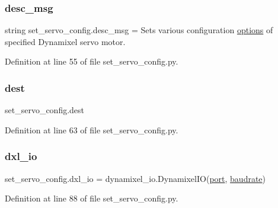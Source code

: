 \subsubsection{\texorpdfstring{desc\+\_\+msg}{desc\_msg}}
{\footnotesize\ttfamily string set\+\_\+servo\+\_\+config.\+desc\+\_\+msg = \textquotesingle{}Sets various configuration \hyperlink{namespaceset__servo__config_ac255726a992a254f0b0e6072b0f86233}{options} of specified Dynamixel servo motor.\textquotesingle{}}



Definition at line 55 of file set\+\_\+servo\+\_\+config.\+py.

\mbox{\label{namespaceset__servo__config_a6408e25902173969cd091873aa3f2613}} 
\subsubsection{\texorpdfstring{dest}{dest}}
{\footnotesize\ttfamily set\+\_\+servo\+\_\+config.\+dest}



Definition at line 63 of file set\+\_\+servo\+\_\+config.\+py.

\mbox{\label{namespaceset__servo__config_a214021294c0a39eaf23ef537bfc60705}} 
\subsubsection{\texorpdfstring{dxl\+\_\+io}{dxl\_io}}
{\footnotesize\ttfamily set\+\_\+servo\+\_\+config.\+dxl\+\_\+io = dynamixel\+\_\+io.\+Dynamixel\+IO(\hyperlink{namespaceset__servo__config_a324ec25da2c0124a9184e551f96f1419}{port}, \hyperlink{namespaceset__servo__config_ab4f26033683458550a8b26b78b5cbd47}{baudrate})}



Definition at line 88 of file set\+\_\+servo\+\_\+config.\+py.

\mbox{\label{namespaceset__servo__config_a5c22d68865380f08b6c332373297893a}} 
